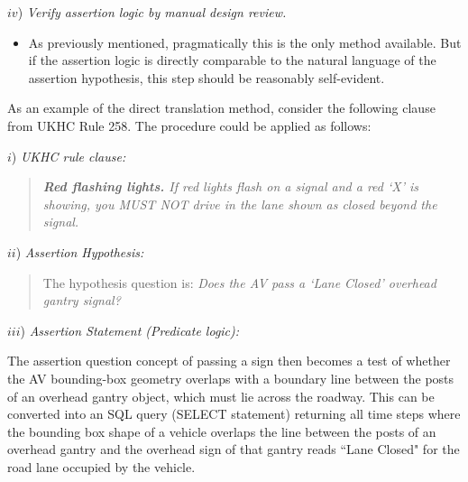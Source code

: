     \noindent $iv$) \emph{Verify assertion logic by manual design review.} %
    \begin{itemize}
    	\item As previously mentioned, pragmatically this is the only method available. But if the assertion logic is directly comparable to the  natural language of the assertion hypothesis, this step should be reasonably self-evident.
    \end{itemize}
    

As an example of the direct translation method, consider the following clause from UKHC Rule 258. The procedure could be applied as follows:

\noindent $i$) \emph{UKHC rule clause:}
	    \begin{quote}
			\textit{\textbf{Red flashing lights.} If red lights flash on a signal and a red `X' is showing, you MUST NOT drive in the lane shown as closed beyond the signal.}
		\end{quote}
\noindent $ii$) \emph{Assertion Hypothesis:}
        \begin{quote}
        	The hypothesis question is: \textit{Does the AV pass a `Lane Closed’ overhead gantry signal?}
        \end{quote}
\noindent $iii$) \emph{Assertion Statement (Predicate logic):}

	The assertion question concept of passing a sign then becomes a test of whether the AV bounding-box geometry overlaps with a boundary line between the posts of an overhead gantry object, which must lie across the roadway. 
	This can be converted into an SQL query (SELECT statement) returning all time steps where the bounding box shape of a vehicle overlaps the line between the posts of an overhead gantry and the overhead sign of that gantry reads ``Lane Closed" for the road lane occupied by the vehicle.      

